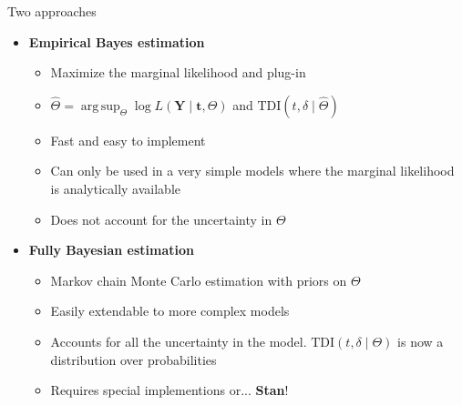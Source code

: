 \documentclass[ignorenonframetext,xcolor=pdflatex,table,dvipsnames,serif]{beamer}
\DeclareMathOperator*{\argsup}{arg\,sup}
\begin{document}
\begin{frame}{Two approaches}
\begin{itemize}
  \item{\textbf{Empirical Bayes estimation}}
  \begin{itemize}
	  \item[\Fire]{Maximize the marginal likelihood and plug-in}
	  \item[\Fire]{$\widehat{\Theta} = \argsup_{\Theta} \log L(\mathbf{Y} \mid \mathbf{t}, \Theta)$ and $\mathrm{TDI}(t, \delta \mid \widehat{\Theta})$}
	  \item[\Smiley]{Fast and easy to implement}
	  \item[\Xey]{Can only be used in a very simple models where the marginal likelihood is analytically available}
	  \item[\Xey]{Does not account for the uncertainty in $\Theta$}
  \end{itemize}
  \pause
  
  \vspace{1cm}
  
  \item{\textbf{Fully Bayesian estimation}}
  \begin{itemize}
	  \item[\Fire]{Markov chain Monte Carlo estimation with priors on $\Theta$}
	  \item[\Smiley]{Easily extendable to more complex models}
	  \item[\Smiley]{Accounts for all the uncertainty in the model. $\mathrm{TDI}(t, \delta \mid \Theta)$ is now a distribution over probabilities}
	  \item[\fryingpan]{Requires special implementions or... \alert{\textbf{Stan}}!}
  \end{itemize}
\end{itemize}
\end{frame}
\end{document}
